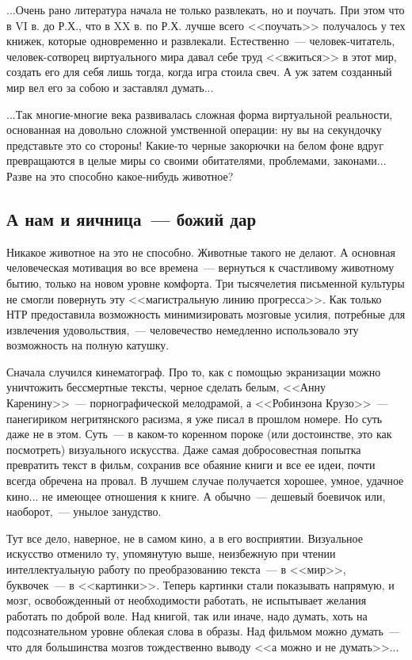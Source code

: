 \documentclass{scrbook}
\newcommand{\flqq}{<<}
\newcommand{\frqq}{>>}
\newcommand{\mdash}{~--- }
\newcommand{\commamdash}{~--- } %
\newcommand{\essaysection}[1]{\subsection*{#1}\nopagebreak}
\begin{document}
...Очень рано литература начала не только развлекать, но и поучать. При этом что в VI в. до Р.Х., что в XX в. по Р.Х. лучше всего {\flqq}поучать{\frqq} получалось у тех книжек, которые одновременно и развлекали. Естественно{\mdash}человек-читатель, человек-сотворец виртуального мира давал себе труд {\flqq}вжиться{\frqq} в этот мир, создать его для себя лишь тогда, когда игра стоила свеч. А уж затем созданный мир вел его за собою и заставлял думать...

...Так многие-многие века развивалась сложная форма виртуальной реальности, основанная на довольно сложной умственной операции: ну вы на секундочку представьте это со стороны! Какие-то черные закорючки на белом фоне вдруг превращаются в целые миры со своими обитателями, проблемами, законами... Разве на это способно какое-нибудь животное?

\essaysection{А нам и яичница{\mdash}божий дар}

Никакое животное на это не способно. Животные такого не делают. А основная человеческая мотивация во все времена{\mdash}вернуться к счастливому животному бытию, только на новом уровне комфорта. Три тысячелетия письменной культуры не смогли повернуть эту {\flqq}магистральную линию прогресса{\frqq}. Как только НТР предоставила возможность минимизировать мозговые усилия, потребные для извлечения удовольствия,{\commamdash}человечество немедленно использовало эту возможность на полную катушку.

Сначала случился кинематограф. Про то, как с помощью экранизации можно уничтожить бессмертные тексты, черное сделать белым, {\flqq}Анну Каренину{\frqq}{\mdash}порнографической мелодрамой, а {\flqq}Робинзона Крузо{\frqq}{\mdash}панегириком негритянского расизма, я уже писал в прошлом номере. Но суть даже не в этом. Суть{\mdash}в каком-то коренном пороке (или достоинстве, это как посмотреть) визуального искусства. Даже самая добросовестная попытка превратить текст в фильм, сохранив все обаяние книги и все ее идеи, почти всегда обречена на провал. В лучшем случае получается хорошее, умное, удачное кино... не имеющее отношения к книге. А обычно{\mdash}дешевый боевичок или, наоборот,{\commamdash}унылое занудство.

Тут все дело, наверное, не в самом кино, а в его восприятии. Визуальное искусство отменило ту, упомянутую выше, неизбежную при чтении интеллектуальную работу по преобразованию текста{\mdash}в {\flqq}мир{\frqq}, буквочек{\mdash}в {\flqq}картинки{\frqq}. Теперь картинки стали показывать напрямую, и мозг, освобожденный от необходимости работать, не испытывает желания работать по доброй воле. Над книгой, так или иначе, надо думать, хоть на подсознательном уровне облекая слова в образы. Над фильмом можно думать{\mdash}что для большинства мозгов тождественно выводу {\flqq}а можно и не думать{\frqq}...
\end{document}
